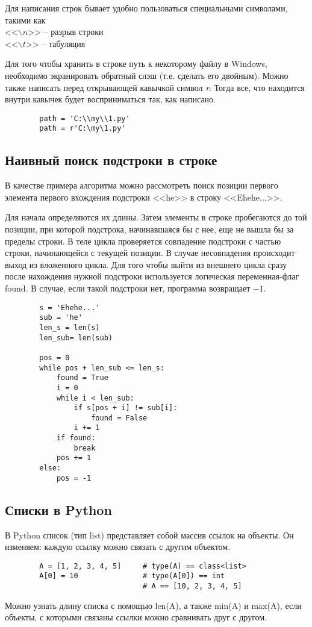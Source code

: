 \documentclass[a4paper, fleqn]{article}
\begin{document}
	Для написания строк бывает удобно пользоваться специальными символами, такими как\\
	<<$\backslash n$>> -- разрыв строки\\
	<<$\backslash t$>> -- табуляция
	
	Для того чтобы хранить в строке путь к некоторому файлу в Windows, необходимо экранировать обратный слэш (т.е. сделать его двойным). Можно также написать перед открывающей кавычкой символ \emph{r}. Тогда все, что находится внутри кавычек будет восприниматься так, как написано.
	\begin{lstlisting}
		path = 'C:\\my\\1.py'
		path = r'C:\my\1.py'
	\end{lstlisting}
	
	\subsection*{Наивный поиск подстроки в строке}
	
	В качестве примера алгоритма можно рассмотреть поиск позиции первого элемента первого вхождения подстроки <<he>> в строку <<Ehehe...>>. 
	
	Для начала определяются их длины. Затем элементы в строке пробегаются до той позиции, при которой подстрока, начинавшаяся бы с нее, еще не вышла бы за пределы строки. 
	В теле цикла проверяется совпадение подстроки с частью строки, начинающейся с текущей позиции. В случае несовпадения происходит выход из вложенного цикла. Для того чтобы выйти из внешнего цикла сразу после нахождения нужной подстроки используется логическая переменная-флаг found. В случае, если такой подстроки нет, программа возвращает $-1$.
	\begin{lstlisting}
		s = 'Ehehe...'
		sub = 'he'
		len_s = len(s)
		len_sub= len(sub)
		
		pos = 0
		while pos + len_sub <= len_s:
			found = True
			i = 0
			while i < len_sub:
				if s[pos + i] != sub[i]:
					found = False
				i += 1
			if found:
				break
			pos += 1
		else:
			pos = -1			
	\end{lstlisting}
	
	
	\subsection*{Списки в Python}
	
	В Python список (тип list) представляет собой массив ссылок на объекты. Он изменяем: каждую ссылку можно связать с другим объектом. 
	\begin{lstlisting}
		A = [1, 2, 3, 4, 5]		# type(A) == class<list>
		A[0] = 10				# type(A[0]) == int
								# A == [10, 2, 3, 4, 5]
	\end{lstlisting}
	Можно узнать длину списка с помощью len(A), а также 
	min(A) и 
	max(A), если объекты, с которыми связаны ссылки можно сравнивать друг с другом. 
	
\end{document}
